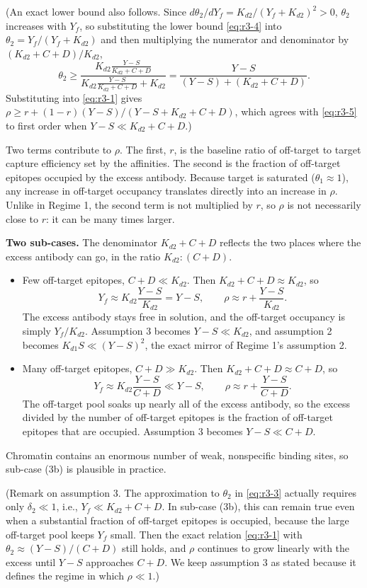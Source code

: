 (An exact lower bound also follows. Since
$d\theta_2/dY_f=K_{d2}/(Y_f+K_{d2})^2>0$, $\theta_2$ increases with
$Y_f$, so substituting the lower bound \eqref{eq:r3-4} into
$\theta_2=Y_f/(Y_f+K_{d2})$ and then multiplying the numerator and
denominator by $(K_{d2}+C+D)/K_{d2}$,
$$
\theta_2
\ge\frac{K_{d2}\frac{Y-S}{K_{d2}+C+D}}
{K_{d2}\frac{Y-S}{K_{d2}+C+D}+K_{d2}}
=\frac{Y-S}{(Y-S)+(K_{d2}+C+D)}.
$$
Substituting into \eqref{eq:r3-1} gives
$\rho\ge r+(1-r)(Y-S)/(Y-S+K_{d2}+C+D)$, which agrees with
\eqref{eq:r3-5} to first order when $Y-S\ll K_{d2}+C+D$.)

Two terms contribute to $\rho$. The first, $r$, is the baseline ratio of
off-target to target capture efficiency set by the affinities. The
second is the fraction of off-target epitopes occupied by the excess
antibody. Because target is saturated ($\theta_1\approx1$), any increase
in off-target occupancy translates directly into an increase in $\rho$.
Unlike in Regime 1, the second term is not multiplied by $r$, so $\rho$ is
not necessarily close to $r$: it can be many times larger.

\textbf{Two sub-cases.} The denominator $K_{d2}+C+D$ reflects the two
places where the excess antibody can go, in the ratio $K_{d2}:(C+D)$.
\begin{itemize}
    \item[(3a)] Few off-target epitopes, $C+D\ll K_{d2}$. Then
    $K_{d2}+C+D\approx K_{d2}$, so
    $$
    Y_f\approx K_{d2}\frac{Y-S}{K_{d2}}=Y-S,
    \qquad
    \rho\approx r+\frac{Y-S}{K_{d2}}.
    $$
    The excess antibody stays free in solution, and the off-target
    occupancy is simply $Y_f/K_{d2}$. Assumption 3 becomes $Y-S\ll K_{d2}$,
    and assumption 2 becomes $K_{d1}S\ll(Y-S)^2$, the exact mirror of
    Regime 1's assumption 2.

    \item[(3b)] Many off-target epitopes, $C+D\gg K_{d2}$. Then
    $K_{d2}+C+D\approx C+D$, so
    $$
    Y_f\approx K_{d2}\frac{Y-S}{C+D}\ll Y-S,
    \qquad
    \rho\approx r+\frac{Y-S}{C+D}.
    $$
    The off-target pool soaks up nearly all of the excess antibody, so the
    excess divided by the number of off-target epitopes is the fraction of
    off-target epitopes that are occupied. Assumption 3 becomes
    $Y-S\ll C+D$.
\end{itemize}
Chromatin contains an enormous number of weak, nonspecific binding sites,
so sub-case (3b) is plausible in practice.

(Remark on assumption 3. The approximation to $\theta_2$ in
\eqref{eq:r3-3} actually requires only $\delta_2\ll1$, i.e.,
$Y_f\ll K_{d2}+C+D$. In sub-case (3b), this can remain true even when a
substantial fraction of off-target epitopes is occupied, because the
large off-target pool keeps $Y_f$ small. Then the exact relation
\eqref{eq:r3-1} with $\theta_2\approx(Y-S)/(C+D)$ still holds, and $\rho$
continues to grow linearly with the excess until $Y-S$ approaches $C+D$.
We keep assumption 3 as stated because it defines the regime in which
$\rho\ll1$.)

